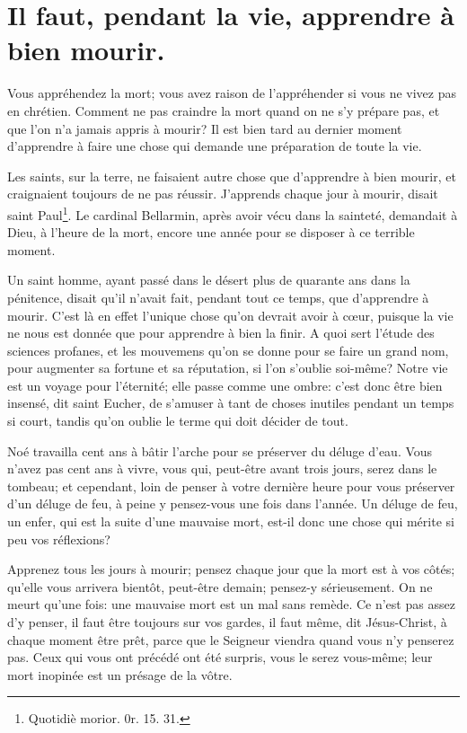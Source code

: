 \documentclass[instructions.tex]{subfiles}
\begin{document}
 
\chapter{Il faut, pendant la vie, apprendre à bien mourir.}
 
\primo Vous appréhendez la mort; vous avez raison de l'appréhender si vous ne vivez pas en chrétien. Comment ne pas craindre la mort quand on ne s'y prépare pas, et que l'on n'a jamais appris à mourir? Il est bien tard au dernier moment d'apprendre à faire une chose qui demande une préparation de toute la vie.
 
Les saints, sur la terre, ne faisaient autre chose que d'apprendre à bien mourir, et craignaient toujours de ne pas réussir. J'apprends chaque jour à mourir, disait saint Paul\footnote{Quotidiè morior. 0r. 15. 31.}. Le cardinal Bellarmin, après avoir vécu dans la sainteté, demandait à Dieu, à l'heure de la mort, encore une année pour se disposer à ce terrible moment.
 
Un saint homme, ayant passé dans le désert plus de quarante ans dans la pénitence, disait qu'il n'avait fait, pendant tout ce temps, que d'apprendre à mourir. C'est là en effet l'unique chose qu'on devrait avoir à cœur, puisque la vie ne nous est donnée que pour apprendre à bien la finir. A quoi sert l'étude des sciences profanes, et les mouvemens qu'on se donne pour se faire un grand nom, pour augmenter sa fortune et sa réputation, si l'on s'oublie soi-même? Notre vie est un voyage pour l'éternité; elle passe comme une ombre: c'est donc être bien insensé, dit saint Eucher, de s'amuser à tant de choses inutiles pendant un temps si court, tandis qu'on oublie le terme qui doit décider de tout.
 
Noé travailla cent ans à bâtir l'arche pour se préserver du déluge d'eau. Vous n'avez pas cent ans à vivre, vous qui, peut-être avant trois jours, serez dans le tombeau; et cependant, loin de penser à votre dernière heure pour vous préserver d'un déluge de feu, à peine y pensez-vous une fois dans l'année. Un déluge de feu, un enfer, qui est la suite d'une mauvaise mort, est-il donc une chose qui mérite si peu vos réflexions?
 
\secundo Apprenez tous les jours à mourir; pensez chaque jour que la mort est à vos côtés; qu'elle vous arrivera bientôt, peut-être demain; pensez-y sérieusement. On ne meurt qu'une fois: une mauvaise mort est un mal sans remède. Ce n'est pas assez d'y penser, il faut être toujours sur vos gardes, il faut même, dit Jésus-Christ, à chaque moment être prêt, parce que le Seigneur viendra quand vous n'y penserez pas. Ceux qui vous ont précédé ont été surpris, vous le serez vous-même; leur mort inopinée est un présage de la vôtre.
 
\end{document}
